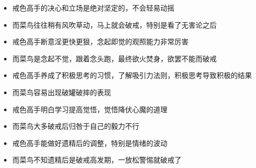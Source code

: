 \documentclass{ctexart}
\begin{document}
\begin{paracol}{2}
    \begin{itemize}
        \item 戒色高手的决心和立场是绝对坚定的，不会轻易动摇
    \end{itemize}
    \switchcolumn
    \begin{itemize}
        \item 而菜鸟往往稍有风吹草动，马上就会破戒，特别是看了无害论之后
    \end{itemize}
    \switchcolumn*

    \begin{itemize}
        \item 戒色高手断意淫更快更狠，念起即觉的观照能力非常厉害
    \end{itemize}
    \switchcolumn
    \begin{itemize}
        \item 而菜鸟是念起不觉，跟着念头跑，最终欲火焚身，欲罢不能而破戒
    \end{itemize}
    \switchcolumn*

    \begin{itemize}
        \item 戒色高手养成了积极思考的习惯，了解吸引力法则，积极思考导致积极的结果
    \end{itemize}
    \switchcolumn
    \begin{itemize}
        \item 而菜鸟容易出现破罐破摔的表现
    \end{itemize}
    \switchcolumn*

    \begin{itemize}
        \item 戒色高手明白学习提高觉悟，觉悟降伏心魔的道理
    \end{itemize}
    \switchcolumn
    \begin{itemize}
        \item 而菜鸟大多破戒后归咎于自己的毅力不行
    \end{itemize}
    \switchcolumn*

    \begin{itemize}
        \item 戒色高手能做好遗精后的调整，特别是情绪的波动
    \end{itemize}
    \switchcolumn
    \begin{itemize}
        \item 而菜鸟不知遗精后是破戒高发期，一放松警惕就破戒了
    \end{itemize}
    \switchcolumn*


\end{paracol}
\end{document}

